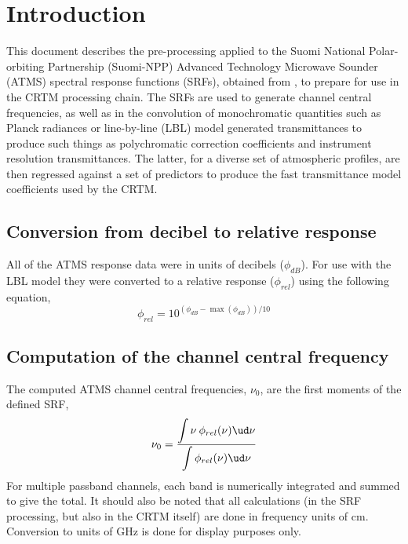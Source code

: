 \section{Introduction}
This document describes the pre-processing applied to the Suomi National Polar-orbiting Partnership (Suomi-NPP) Advanced Technology Microwave Sounder (ATMS) spectral response functions (SRFs), obtained from \cite{ATMS_SRF_Data}, to prepare for use in the CRTM processing chain. The SRFs are used to generate channel central frequencies, as well as in the convolution of monochromatic quantities such as Planck radiances or line-by-line (LBL) model generated transmittances to produce such things as polychromatic correction coefficients and instrument resolution transmittances. The latter, for a diverse set of atmospheric profiles, are then regressed against a set of predictors to produce the fast transmittance model coefficients used by the CRTM.


\subsection{Conversion from decibel to relative response}
All of the ATMS response data were in units of decibels ($\phi_{dB}$). For use with the LBL model they were converted to a relative response ($\phi_{rel}$) using the following equation,
\begin{equation}
  \phi_{rel} = 10^{\displaystyle(\phi_{dB}-\max(\phi_{dB}))/10}
\end{equation} 


\subsection{Computation of the channel central frequency}
The computed ATMS channel central frequencies, $\nu_0$, are the first moments of the defined SRF,
\begin{equation}
  \nu_0 = \frac{\displaystyle\int{\nu\:\phi_{rel}(\nu)\ud \nu}}{\displaystyle\int{\phi_{rel}(\nu)\ud \nu}}
\end{equation}
For multiple passband channels, each band is numerically integrated and summed to give the total. It should also be noted that all calculations (in the SRF processing, but also in the CRTM itself) are done in frequency units of cm. Conversion to units of GHz is done for display purposes only.


